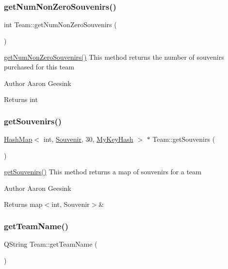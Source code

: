 \subsubsection{\texorpdfstring{getNumNonZeroSouvenirs()}{getNumNonZeroSouvenirs()}}
{\footnotesize\ttfamily int Team\+::get\+Num\+Non\+Zero\+Souvenirs (\begin{DoxyParamCaption}{ }\end{DoxyParamCaption})}



\mbox{\hyperlink{class_team_a369e1504be751aa8bf1445a69901e9da}{get\+Num\+Non\+Zero\+Souvenirs()}} This method returns the number of souvenirs purchased for this team 

\begin{DoxyAuthor}{Author}
Aaron Geesink 
\end{DoxyAuthor}
\begin{DoxyReturn}{Returns}
int 
\end{DoxyReturn}
\mbox{\label{class_team_a1f677711d70b0efedde0c24445813dc2}} 
\subsubsection{\texorpdfstring{getSouvenirs()}{getSouvenirs()}}
{\footnotesize\ttfamily \mbox{\hyperlink{class_hash_map}{Hash\+Map}}$<$ int, \mbox{\hyperlink{class_souvenir}{Souvenir}}, 30, \mbox{\hyperlink{struct_my_key_hash}{My\+Key\+Hash}} $>$ $\ast$ Team\+::get\+Souvenirs (\begin{DoxyParamCaption}{ }\end{DoxyParamCaption})}



\mbox{\hyperlink{class_team_a1f677711d70b0efedde0c24445813dc2}{get\+Souvenirs()}} This method returns a map of souvenirs for a team 

\begin{DoxyAuthor}{Author}
Aaron Geesink 
\end{DoxyAuthor}
\begin{DoxyReturn}{Returns}
map$<$int, Souvenir$>$\& 
\end{DoxyReturn}
\mbox{\label{class_team_a36148ba356032791f4789a493e1ee149}} 
\subsubsection{\texorpdfstring{getTeamName()}{getTeamName()}}
{\footnotesize\ttfamily Q\+String Team\+::get\+Team\+Name (\begin{DoxyParamCaption}{ }\end{DoxyParamCaption})}



